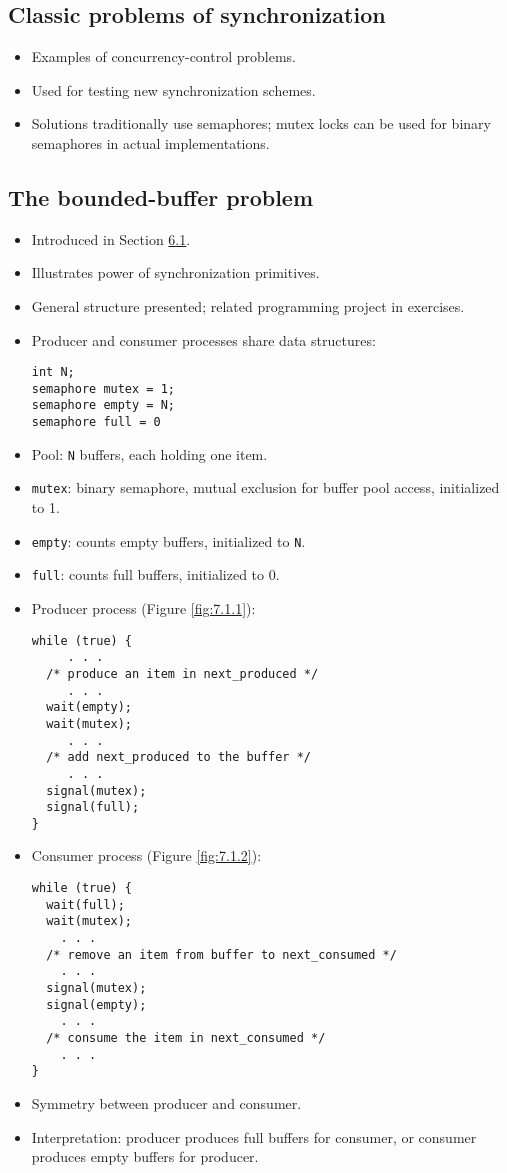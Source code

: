 \subsection{Classic problems of synchronization}
\begin{itemize}
    \item Examples of concurrency-control problems.
    \item Used for testing new synchronization schemes.
    \item Solutions traditionally use semaphores; mutex locks can be used for binary semaphores in actual implementations.
\end{itemize}

\subsection{The bounded-buffer problem}
\begin{itemize}
    \item Introduced in Section \hyperref[sec:6.1]{6.1}.
    \item Illustrates power of synchronization primitives.
    \item General structure presented; related programming project in exercises.
    \item Producer and consumer processes share data structures:
    \begin{verbatim}
int N;
semaphore mutex = 1;
semaphore empty = N;
semaphore full = 0
\end{verbatim}
    \item Pool: \texttt{N} buffers, each holding one item.
    \item \texttt{mutex}: binary semaphore, mutual exclusion for buffer pool access, initialized to 1.
    \item \texttt{empty}: counts empty buffers, initialized to \texttt{N}.
    \item \texttt{full}: counts full buffers, initialized to 0.
    \item Producer process (Figure \ref{fig:7.1.1}):
    \begin{verbatim}
while (true) {
     . . .
  /* produce an item in next_produced */
     . . .
  wait(empty);
  wait(mutex);
     . . .
  /* add next_produced to the buffer */
     . . .
  signal(mutex);
  signal(full);
}
    \end{verbatim}
    \item Consumer process (Figure \ref{fig:7.1.2}):
    \begin{verbatim}
while (true) {
  wait(full);
  wait(mutex);
    . . .
  /* remove an item from buffer to next_consumed */
    . . .
  signal(mutex);
  signal(empty);
    . . .
  /* consume the item in next_consumed */
    . . .
}
    \end{verbatim}
    \item Symmetry between producer and consumer.
    \item Interpretation: producer produces full buffers for consumer, or consumer produces empty buffers for producer.
\end{itemize}


